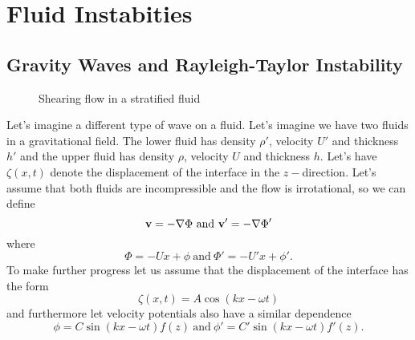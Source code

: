 \chapter{Fluid Instabities}
\label{cha:fluid-instabities}
\label{sec:instabilities}
\section{Gravity Waves and Rayleigh-Taylor Instability}
\label{sec:gravitywaves}

\begin{figure}
\begin{center}
\end{center}
\caption{Shearing flow in a stratified fluid}
\end{figure}
Let's imagine a different type of wave on a fluid.  Let's imagine we
have two fluids in a gravitational field.  The lower fluid has density
$\rho'$, velocity $U'$ and thickness $h'$ and the upper fluid has
density $\rho$, velocity $U$ and
thickness $h$.  Let's have $\zeta(x,t)$ denote the displacement of the
interface in the $z-$direction.  Let's assume that both fluids are
incompressible and the flow is irrotational, so we can define
\begin{equation}
{\bf v} = -\nabla \Phi ~\mathrm{and}~ {\bf v}' = -\nabla \Phi'
\end{equation}
where
\begin{equation}
\Phi = -U x + \phi~\mathrm{and}~ \Phi' = -U' x + \phi'.
\end{equation}
To make further progress let us assume that the displacement of the
interface has the form
\begin{equation}
\zeta(x,t) = A \cos \left ( k x - \omega t \right )
\end{equation}
and furthermore let velocity potentials also have a similar dependence
\begin{equation}
  \phi = C \sin \left (k x - \omega t\right ) f(z)~\mathrm{and}~
  \phi' = C' \sin \left (k x - \omega t\right ) f'(z).
\end{equation}
